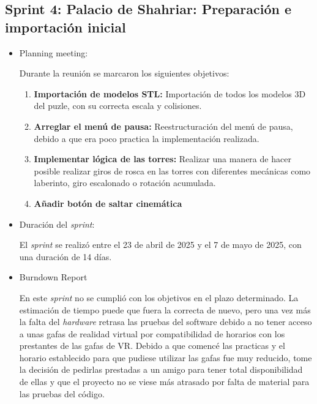 \subsection{\textbf{Sprint 4: Palacio de Shahriar: Preparación e importación inicial } }
\begin{itemize}
    \item {Planning meeting:}
    
Durante la reunión se marcaron los siguientes objetivos:
\begin{enumerate}
  \item \textbf{Importación de modelos STL:} Importación de todos los modelos 3D del puzle, con su correcta escala y colisiones. 

  \item \textbf{Arreglar el menú de pausa:} Reestructuración del menú de pausa, debido a que era poco practica la implementación realizada.  

  \item \textbf{Implementar lógica de las torres:}  Realizar una manera de hacer posible realizar giros de rosca en las torres con diferentes mecánicas como laberinto, giro escalonado o rotación acumulada.

  \item \textbf{Añadir botón de saltar cinemática}

\end{enumerate}
    \item {Duración del \textit{sprint}:}
    
El \textit{sprint} se realizó entre el 23 de abril de 2025 y el 7 de mayo de 2025, con una duración de 14 días.
    \item {Burndown Report}
    
En este \textit{sprint} no se cumplió con los objetivos en el plazo determinado. La estimación de tiempo puede que fuera la correcta de nuevo, pero una vez más la falta del \textit{hardware} retrasa las pruebas del software debido a no tener acceso a unas gafas de realidad virtual por compatibilidad de horarios con los prestantes de las gafas de VR. Debido a que comencé las practicas y el horario establecido para que pudiese utilizar las gafas fue muy reducido, tome la decisión de pedirlas prestadas a un amigo para tener total disponibilidad de ellas y que el proyecto no se viese más atrasado por falta de material para las pruebas del código. 

\end{itemize}

